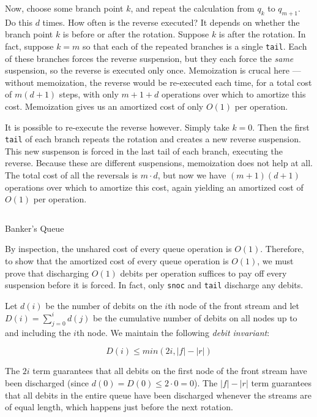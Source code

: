 \documentclass[12pt, a4paper]{article} %
\newcommand{\code}[1]{\texttt{#1}} %
\begin{document}
Now, choose some branch point $k$, and repeat the calculation from $q_k$ to $q_{m+1}$. Do this $d$ times. How often is the reverse executed? It depends on whether the branch point $k$ is before or after the rotation. Suppose $k$ is after the rotation. In fact, suppose $k = m$ so that each of the repeated branches is a single \code{tail}. Each of these branches forces the reverse suspension, but they each force the \textit{same} suspension, so the reverse is executed only once. Memoization is crucal here --- without memoization, the reverse would be re-executed each time, for a total cost of ${m(d+1)}$ steps, with only ${m + 1 + d}$ operations over which to amortize this cost. Memoization gives us an amortized cost of only $O(1)$ per operation.

It is possible to re-execute the reverse however. Simply take $k = 0$. Then the first \code{tail} of each branch repeats the rotation and creates a new reverse suspension. This new suspenson is forced in the last tail of each branch, executing the reverse. Because these are different suspensions, memoization does not help at all. The total cost of all the reversals is $m \cdot d$, but now we have ${(m + 1)(d + 1)}$ operations over which to amortize this cost, again yielding an amortized cost of $O(1)$ per operation.

\begin{listing}[H]
  \inputminted[breaklines=true]{haskell}{../../Chapter6/BankersQueue.hs}
  \caption{Banker's Queue}
  \label{lst:banker's queue}
\end{listing}

By inspection, the unshared cost of every queue operation is $O(1)$. Therefore, to show that the amortized cost of every queue operation is $O(1)$, we must prove that discharging $O(1)$ debits per operation suffices to pay off every suspension before it is forced. In fact, only \code{snoc} and \code{tail} discharge any debits.

\newpage

Let $d(i)$ be the number of debits on the $i$th node of the front stream and let $D(i) = \sum_{j = 0}^{i} d(j)$ be the cumulative number of debits on all nodes up to and including the $i$th node. We maintain the following \textit{debit invariant}:

\[
  D(i) \leq min(2i, |f| - |r|)
\]

The $2i$ term guarantees that all debits on the first node of the front stream have been discharged (since $d(0) = D(0) \leq 2 \cdot 0 = 0$). The $|f| - |r|$ term guarantees that all debits in the entire queue have been discharged whenever the streams are of equal length, which happens just before the next rotation.
\end{document}
